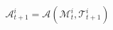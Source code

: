 \documentclass[preview]{standalone}
\begin{document}
\begin{align*}
\mathcal{A}_{t+1}^{i} = \mathcal{A}(\mathcal{M}_{t}^{i}, \mathcal{T}_{t+1}^{i})
\end{align*}
\end{document}
